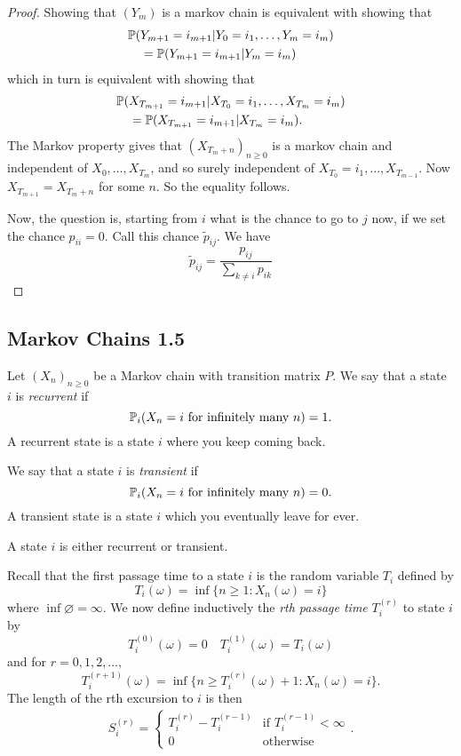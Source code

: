 \begin{proof}
Showing that \((Y_{m})\) is a markov chain is equivalent with showing that
\begin{align*}
\Bbb{P}(&Y_{m+1}=i_{m+1} | Y_{0}=i_{1},\ldots ,Y_{m}=i_{m} ) \\
&=\Bbb{P}(Y_{m+1}=i_{m+1} | Y_{m}=i_{m})
\end{align*}
which in turn is equivalent with showing that
\begin{align*}
\Bbb{P}(&X_{T_{m+1}}=i_{m+1} | X_{T_{0}} =i_{1},\ldots ,X_{T_{m}}=i_{m} ) \\
&=\Bbb{P}(X_{T_{m+1}}=i_{m+1} | X_{T_{m}}=i_{m} ).
\end{align*}
The Markov property gives that \((X_{T_{m}+n})_{n\geq 0}\) is a markov chain and independent of $X_{0},\ldots ,X_{T_{m}}$, and so surely independent of \(X_{T_{0}} =i_{1},\ldots ,X_{T_{m-1}}\). Now \(X_{T_{m+1}}=X_{T_{m}+n}\) for some $n$. So the equality follows.

Now, the question is, starting from \(i\) what is the chance to go to \(j\) now, if we set the chance \(p_{ii}=0\). Call this chance \(\tilde{p}_{ij}\). We have
\[
\tilde{p}_{ij}=\frac{p_{ij}}{\sum \limits_{k\neq i}p_{ik}}
\]
\end{proof}
\subsection{Markov Chains 1.5}
\begin{defn}
Let \((X_{n})_{n\geq 0}\) be a Markov chain with transition matrix \(P\). We say that a state \(i\) is \emph{recurrent} if
\[
\Bbb{P}_{i}(X_{n}=i \text{ for infinitely many }n)=1.
\]
A recurrent state is a state \(i\) where you keep coming back.
\end{defn}

\begin{defn}
We say that a state \(i\) is \emph{transient} if
\[
\Bbb{P}_{i}(X_{n}=i \text{ for infinitely many }n)=0.
\]
A transient state is a state \(i\) which you eventually leave for ever.
\end{defn}

\begin{thm}
A state \(i\) is either recurrent or transient.
\end{thm}

\begin{defn}
Recall that the first passage time to a state \(i\) is the random variable \(T_{i}\) defined by
\[
T_{i}(\omega )=\inf\{n\geq 1 : X_{n}(\omega )=i\}
\]
where \(\inf \varnothing =\infty .\) We now define inductively the \emph{rth passage time} \(T_{i}^{(r)}\) to state \(i\) by
\[
T_{i}^{(0)}(\omega )=0 \quad T_{i}^{(1)}(\omega )=T_{i}(\omega )
\]
and for \(r=0,1,2,\ldots ,\)
\[
T_{i}^{(r+1)}(\omega )=\inf\{n\geq T_{i}^{(r)}(\omega )+1 : X_{n}(\omega )=i\}.
\]
The length of the rth excursion to \(i\) is then
\begin{align*}
S_{i}^{(r)}=\begin{cases}T_{i}^{(r)}-T_{i}^{(r-1)} &\text{if }T_{i}^{(r-1)}<\infty  \\0 & \text{otherwise}\end{cases}.
\end{align*}
\end{defn}


